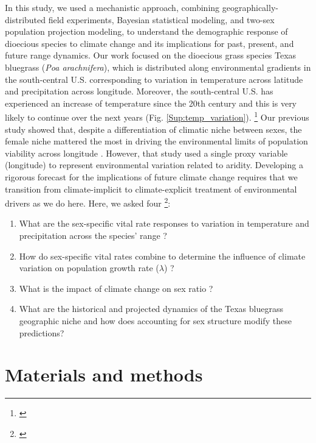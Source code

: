 \documentclass[12pt]{article}
\newcommand{\jacob}[2]{{\color{blue}{#1}}\footnote{\textit{\color{blue}{#2}}}}
\begin{document}
In this study, we used a mechanistic approach, combining geographically-distributed field experiments, Bayesian statistical modeling, and two-sex population projection modeling, to understand the demographic response of dioecious species to climate change and its implications for past, present, and future range dynamics. 
Our work focused on the dioecious grass species Texas bluegrass (\textit{Poa arachnifera}), which is distributed along environmental gradients in the south-central U.S. corresponding to variation in temperature across latitude and precipitation across longitude. 
Moreover, the south-central U.S. has experienced an increase of temperature since the 20th century and this is very likely to continue over the next years (Fig. \ref{Sup:temp_variation}).  
\jacob{}{I added some context about climate change in this study region}
Our previous study showed that, despite a differentiation of climatic niche between sexes, the female niche mattered the most in driving the environmental limits of population viability across longitude \citep{miller2022two}. 
However, that study used a single proxy variable (longitude) to represent environmental variation related to aridity. 
Developing a rigorous forecast for the implications of future climate change requires that we transition from climate-implicit to climate-explicit treatment of environmental drivers as we do here.
Here, we asked four \jacob{questions}{I changed the order of the questions. What was Q4 is now Q3}: 
\begin{enumerate}
	\item What are the sex-specific vital rate responses to variation in temperature and precipitation across the species' range ?
	\item How do sex-specific vital rates combine to determine the influence of climate variation on population growth rate ($\lambda$) ?
	\item What is the impact of climate change on sex ratio ?
	\item What are the historical and projected dynamics of the Texas bluegrass geographic niche and how does accounting for sex structure modify these predictions?
\end{enumerate}

\section*{Materials and methods}
\end{document}
